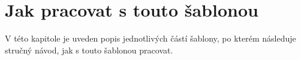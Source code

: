 





\chapter{Jak pracovat s touto šablonou}
\label{jak}

V této kapitole je uveden popis jednotlivých částí šablony, po kterém následuje stručný návod, jak s touto šablonou pracovat.